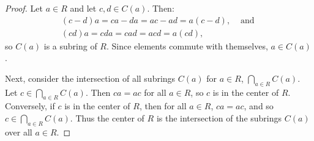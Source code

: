 \documentclass{article}
\begin{document}
\begin{proof}
    Let $a \in R$ and let $c, d \in C(a)$. Then:
    \begin{align*}
        (c - d)a = ca - da = ac - ad = a(c - d),& \text{ and } \\
        (cd)a = cda = cad = acd = a(cd),&
    \end{align*}
    so $C(a)$ is a subring of $R$. Since elements commute with themselves, $a \in C(a)$.

    Next, consider the intersection of all subrings $C(a)$ for $a \in R$, $\bigcap_{a \in R} C(a)$. Let $c \in \bigcap_{a \in R} C(a)$. Then $ca = ac$ for all $a \in R$, so $c$ is in the center of $R$. Conversely, if $c$ is in the center of $R$, then for all $a \in R$, $ca = ac$, and so $c \in \bigcap_{a \in R} C(a)$. Thus the center of $R$ is the intersection of the subrings $C(a)$ over all $a \in R$.
\end{proof}
\end{document}

